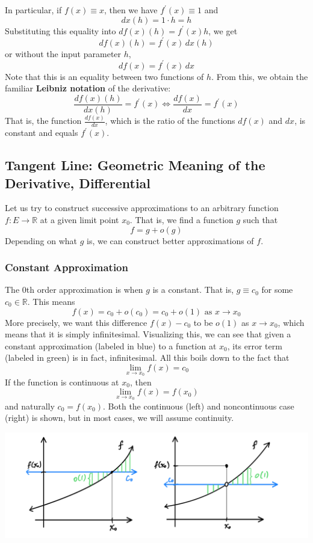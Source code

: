     In particular, if $f(x) \equiv x$, then we have $f^\prime (x) \equiv 1$ and 
    \[dx (h) = 1 \cdot h = h\]
    Substituting this equality into $df(x) (h) = f^\prime (x) h$, we get
    \[df (x) (h) = f^\prime (x) \,dx (h)\]
    or without the input parameter $h$, 
    \[df(x) = f^\prime (x) \,dx\]
    Note that this is an equality between two functions of $h$. From this, we obtain the familiar \textbf{Leibniz notation} of the derivative: 
    \[\frac{df (x) (h)}{dx(h)} = f^\prime (x) \iff \frac{df(x)}{dx} = f^\prime (x)\]
    That is, the function $\frac{df(x)}{dx}$, which is the ratio of the functions $df(x)$ and $dx$, is constant and equals $f^\prime (x)$. 

  \subsection{Tangent Line: Geometric Meaning of the Derivative, Differential}

    Let us try to construct successive approximations to an arbitrary function $f: E \longrightarrow \mathbb{R}$ at a given limit point $x_0$. That is, we find a function $g$ such that
    \[f = g + o(g)\]
    Depending on what $g$ is, we can construct better approximations of $f$. 

    \subsubsection{Constant Approximation}
    The 0th order approximation is when $g$ is a constant. That is, $g \equiv c_0$ for some $c_0 \in \mathbb{R}$. This means
    \[f(x) = c_0 + o(c_0) = c_0 + o(1) \text{ as } x \rightarrow x_0\]
    More precisely, we want this difference $f(x) - c_0$ to be $o(1)$ as $x \rightarrow x_0$, which means that it is simply infinitesimal. Visualizing this, we can see that given a constant approximation (labeled in blue) to a function at $x_0$, its error term (labeled in green) is in fact, infinitesimal. All this boils down to the fact that 
    \[\lim_{x \rightarrow x_0} f(x) = c_0\]
    If the function is continuous at $x_0$, then 
    \[\lim_{x \rightarrow x_0} f(x) = f(x_0)\]
    and naturally $c_0 = f(x_0)$. Both the continuous (left) and noncontinuous case (right) is shown, but in most cases, we will assume continuity. 
    \begin{center}
        \includegraphics[scale=0.3]{img/Constant_Approximation_Continuous_Noncontinuous_case.PNG}
    \end{center}

